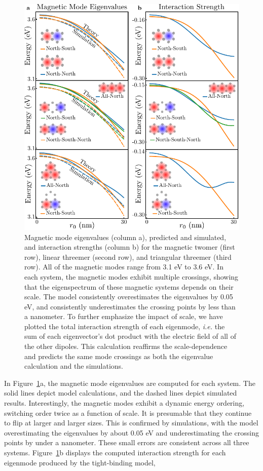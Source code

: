 \documentclass[journal=apchd5,manuscript=article]{achemso}
\begin{document}
\begin{figure}
\centering
\includegraphics[width=5in]{magmodes.pdf}
\caption{Magnetic mode eigenvalues (column a), predicted and simulated, and interaction strengths (column b) for the magnetic twomer (first row), linear threemer (second row), and triangular threemer (third row). All of the magnetic modes range from 3.1 eV to 3.6 eV. In each system, the magnetic modes exhibit multiple crossings, showing that the eigenspectrum of these magnetic systems depends on their scale. The model consistently overestimates the eigenvalues by 0.05 eV, and consistently underestimates the crossing points by less than a nanometer. To further emphasize the impact of scale, we have plotted the total interaction strength of each eigenmode, \textit{i.e.} the sum of each eigenvector's dot product with the electric field of all of the other dipoles. This calculation reaffirms the scale-dependence and predicts the same mode crossings as both the eigenvalue calculation and the simulations.}
\label{magmodes}
\end{figure}

In Figure~\ref{magmodes}a, the magnetic mode eigenvalues are computed for each system. The solid lines depict model calculations, and the dashed lines depict simulated results. Interestingly, the magnetic modes exhibit a dynamic energy ordering, switching order twice as a function of scale. It is presumable that they continue to flip at larger and larger sizes. This is confirmed by simulations, with the model overestimating the eigenvalues by about 0.05 eV and underestimating the crossing points by under a nanometer. These small errors are consistent across all three systems. Figure~\ref{magmodes}b displays the computed interaction strength for each eigenmode produced by the tight-binding model,
\end{document}
